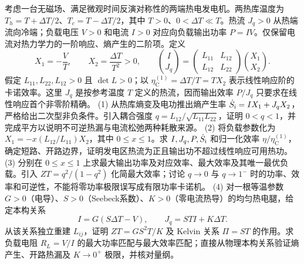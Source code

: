 考虑一台无磁场、满足微观时间反演对称性的两端热电发电机。两热库温度为 \(T_h=T+\Delta T/2\)、\(T_c=T-\Delta T/2\)，其中 \(T>0\)、\(0<\Delta T\ll T\)。热流 \(J_q>0\) 从热端流向冷端；负载电压 \(V>0\) 和电流 \(I>0\) 对应向负载输出功率 \(P=IV\)。仅保留电流对热力学力的一阶响应、熵产生的二阶项。定义
\[
X_1=-\frac{V}{T},\qquad X_2=\frac{\Delta T}{T^2}>0,\qquad
\binom{I}{J_q}=
\begin{pmatrix}L_{11}&L_{12}\\L_{12}&L_{22}\end{pmatrix}
\binom{X_1}{X_2}.
\]
假定 \(L_{11},L_{22},L_{12}>0\) 且 \(\det L>0\)；以 \(\eta_{\mathrm C}^{(1)}=\Delta T/T=T X_2\) 表示线性响应阶的卡诺效率。这里 \(J_q\) 是按参考温度 \(T\) 定义的热流，因而输出效率 \(P/J_q\) 只要求在线性响应首个非零阶精确。
(1) 从热库熵变及电功推出熵产生率 \(\dot S_{\rm i}=I X_1+J_q X_2\)，严格给出二次型非负条件。引入耦合强度 \(q=L_{12}/\sqrt{L_{11}L_{22}}\)，证明 \(0<q<1\)，并完成平方以说明不可逆热漏与电流松弛两种耗散来源。
(2) 将负载参数化为 \(X_1=-x(L_{12}/L_{11})X_2\)，其中 \(0\le x\le1\)。求 \(I,J_q,P,\dot S_{\rm i}\) 和归一化效率 \(\eta/\eta_{\mathrm C}^{(1)}\)，确定短路、开路边界，证明发电区热流为正且输出功不超过线性响应可用热功。
(3) 分别在 \(0\le x\le1\) 上求最大输出功率及对应效率、最大效率及其唯一最优负载。引入 \(ZT=q^2/(1-q^2)\) 化简最大效率；讨论 \(q\to0\) 与 \(q\to1^-\) 时的功率、效率和可逆性，不能将零功率极限误写成有限功率卡诺机。
(4) 对一根等温参数 \(G>0\)（电导）、\(S>0\)（Seebeck系数）、\(K>0\)（零电流热导）的均匀热电腿，给定本构关系
\[
I=G(S\Delta T-V),\qquad J_q=STI+K\Delta T .
\]
从该关系独立重建 \(L_{ij}\)，证明 \(ZT=GS^2T/K\) 及 Kelvin 关系 \(\Pi=ST\) 的作用。求负载电阻 \(R_L=V/I\) 的最大功率匹配与最大效率匹配；直接从物理本构关系验证熵产生、开路热漏及 \(K\to0^+\) 极限，并核对量纲。